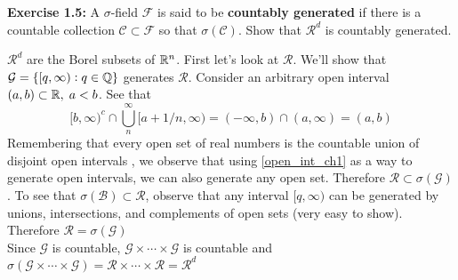 \noindent\textbf{Exercise 1.5:} A $\sigma$-field $\mathcal{F}$ is said to be \textbf{countably generated} if there is a countable collection $\mathcal{C} \subset \mathcal{F}$ so that $\sigma(\mathcal{C})$. Show that $\mathcal{R}^d$ is countably generated.
\begin{mdframed}
    $\mathcal{R}^d$ are the Borel subsets of $\mathbb{R}^n$. First let's look at $\mathcal{R}$. We'll show that $\mathcal{G} = \{[q, \infty): q \in \mathbb{Q}\}$ generates  $\mathcal{R}$. Consider an arbitrary open interval $(a, b)\subset \mathbb{R}, \; a < b$. See that 
    \begin{equation}\label{open_int_ch1}
        [b, \infty)^c \cap \bigcup_{n}^\infty[a + 1/n, \infty) = (-\infty, b) \cap (a, \infty) = (a,b) 
    \end{equation}
    Remembering that every open set of real numbers is the countable union of disjoint open intervals \cite[42]{royden2nd}, we observe that using \ref{open_int_ch1} as a way to generate open intervals, we can also generate any open set. Therefore $\mathcal{R} \subset \sigma(\mathcal{G})$. To see that $\sigma (\mathcal{B}) \subset \mathcal{R}$, observe that any interval $[q, \infty)$ can be generated by unions, intersections, and complements of open sets (very easy to show). Therefore $\mathcal{R} = \sigma(\mathcal{G})$\\
    Since $\mathcal{G}$ is countable, $\mathcal{G} \times \cdots \times \mathcal{G}$ is countable and $\sigma(\mathcal{G} \times \cdots \times \mathcal{G}) = \mathcal{R} \times \cdots \times \mathcal{R} = \mathcal{R}^d$

\end{mdframed}




